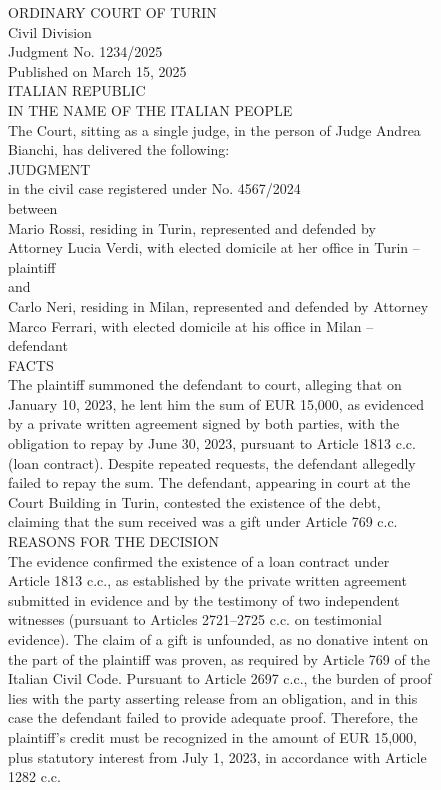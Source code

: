 \begin{figure}[htbp]
\centering
\begin{minipage}{0.9\linewidth}
\small
ORDINARY COURT OF TURIN\\
Civil Division\\
Judgment No. 1234/2025\\
Published on March 15, 2025\\[1em]
ITALIAN REPUBLIC\\
IN THE NAME OF THE ITALIAN PEOPLE\\[1em]
The Court, sitting as a single judge, in the person of Judge Andrea Bianchi, has delivered the following:\\[1em]
JUDGMENT\\[0.5em]
in the civil case registered under No. 4567/2024\\
between\\[0.5em]
Mario Rossi, residing in Turin, represented and defended by Attorney Lucia Verdi, with elected domicile at her office in Turin -- plaintiff\\[0.5em]
and\\[0.5em]
Carlo Neri, residing in Milan, represented and defended by Attorney Marco Ferrari, with elected domicile at his office in Milan -- defendant\\[1em]
FACTS\\
The plaintiff summoned the defendant to court, alleging that on January 10, 2023, he lent him the sum of EUR 15,000, as evidenced by a private written agreement signed by both parties, with the obligation to repay by June 30, 2023, pursuant to Article 1813 c.c. (loan contract). Despite repeated requests, the defendant allegedly failed to repay the sum. The defendant, appearing in court at the Court Building in Turin, contested the existence of the debt, claiming that the sum received was a gift under Article 769 c.c.\\[1em]
REASONS FOR THE DECISION\\
The evidence confirmed the existence of a loan contract under Article 1813 c.c., as established by the private written agreement submitted in evidence and by the testimony of two independent witnesses (pursuant to Articles 2721--2725 c.c. on testimonial evidence). The claim of a gift is unfounded, as no donative intent on the part of the plaintiff was proven, as required by Article 769 of the Italian Civil Code. Pursuant to Article 2697 c.c., the burden of proof lies with the party asserting release from an obligation, and in this case the defendant failed to provide adequate proof. Therefore, the plaintiff's credit must be recognized in the amount of EUR 15,000, plus statutory interest from July 1, 2023, in accordance with Article 1282 c.c.\\[1em]

\end{minipage}
\end{figure}
